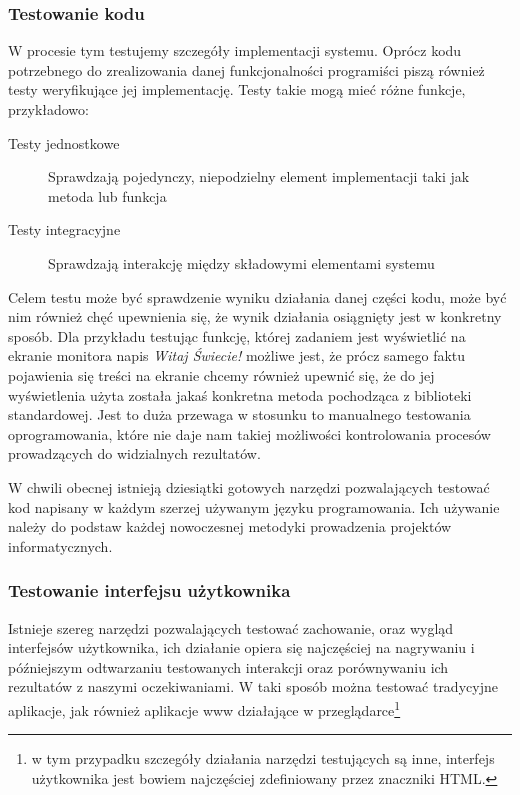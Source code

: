 	    \subsubsection{Testowanie kodu}
	    
	      W procesie tym testujemy szczegóły implementacji systemu. Oprócz kodu potrzebnego do zrealizowania danej funkcjonalności programiści piszą również testy weryfikujące jej implementację. Testy takie mogą mieć różne funkcje, przykładowo:
	      
	      \begin{description}
	        \item[Testy jednostkowe] Sprawdzają pojedynczy, niepodzielny element implementacji taki jak metoda lub funkcja
	        \item[Testy integracyjne] Sprawdzają interakcję między składowymi elementami systemu
        \end{description}
        
        Celem testu może być sprawdzenie wyniku działania danej części kodu, może być nim również chęć upewnienia się, że wynik działania osiągnięty jest w konkretny sposób. Dla przykładu testując funkcję, której zadaniem jest wyświetlić na ekranie monitora napis \emph{Witaj Świecie!} możliwe jest, że prócz samego faktu pojawienia się treści na ekranie chcemy również upewnić się, że do jej wyświetlenia użyta została jakaś konkretna metoda pochodząca z biblioteki standardowej. Jest to duża przewaga w stosunku to manualnego testowania oprogramowania, które nie daje nam takiej możliwości kontrolowania procesów prowadzących do widzialnych rezultatów.

        W chwili obecnej istnieją dziesiątki gotowych narzędzi pozwalających testować kod napisany w każdym szerzej używanym języku programowania. Ich używanie należy do podstaw każdej nowoczesnej metodyki prowadzenia projektów informatycznych.
        
      \subsubsection{Testowanie interfejsu użytkownika}
        
        Istnieje szereg narzędzi pozwalających testować zachowanie, oraz wygląd interfejsów użytkownika, ich działanie opiera się najczęściej na nagrywaniu i późniejszym odtwarzaniu testowanych interakcji oraz porównywaniu ich rezultatów z naszymi oczekiwaniami. W taki sposób można testować tradycyjne aplikacje, jak również aplikacje www działające w przeglądarce\footnote{w tym  przypadku szczegóły działania narzędzi testujących są inne, interfejs użytkownika jest bowiem najczęściej zdefiniowany przez znaczniki HTML.}
        
